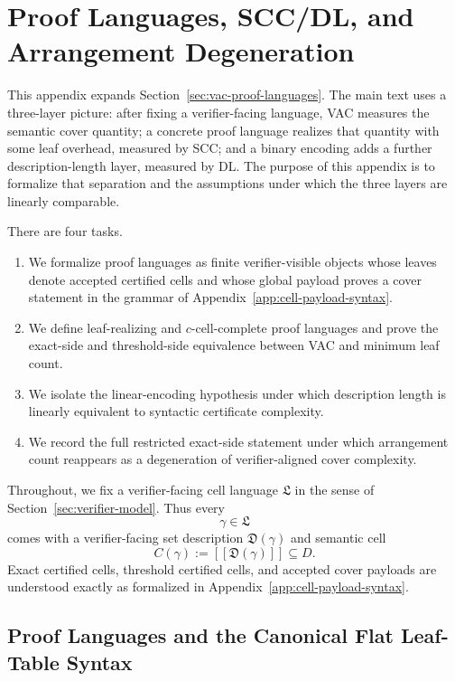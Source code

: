 \section{Proof Languages, SCC/DL, and Arrangement Degeneration}
\label{app:proof-language-dl}

This appendix expands Section~\ref{sec:vac-proof-languages}. The main text uses a three-layer picture: after fixing a verifier-facing language, VAC measures the semantic cover quantity; a concrete proof language realizes that quantity with some leaf overhead, measured by SCC; and a binary encoding adds a further description-length layer, measured by DL. The purpose of this appendix is to formalize that separation and the assumptions under which the three layers are linearly comparable.

There are four tasks.
\begin{enumerate}
    \item We formalize proof languages as finite verifier-visible objects whose leaves denote accepted certified cells and whose global payload proves a cover statement in the grammar of Appendix~\ref{app:cell-payload-syntax}.
    \item We define leaf-realizing and $c$-cell-complete proof languages and prove the exact-side and threshold-side equivalence between VAC and minimum leaf count.
    \item We isolate the linear-encoding hypothesis under which description length is linearly equivalent to syntactic certificate complexity.
    \item We record the full restricted exact-side statement under which arrangement count reappears as a degeneration of verifier-aligned cover complexity.
\end{enumerate}

Throughout, we fix a verifier-facing cell language $\mathfrak L$ in the sense of Section~\ref{sec:verifier-model}. Thus every
\[
\gamma\in\mathfrak L
\]
comes with a verifier-facing set description $\mathfrak D(\gamma)$ and semantic cell
\[
C(\gamma):=[\![\mathfrak D(\gamma)]\!]\subseteq D.
\]
Exact certified cells, threshold certified cells, and accepted cover payloads are understood exactly as formalized in Appendix~\ref{app:cell-payload-syntax}.

\subsection{Proof Languages and the Canonical Flat Leaf-Table Syntax}

